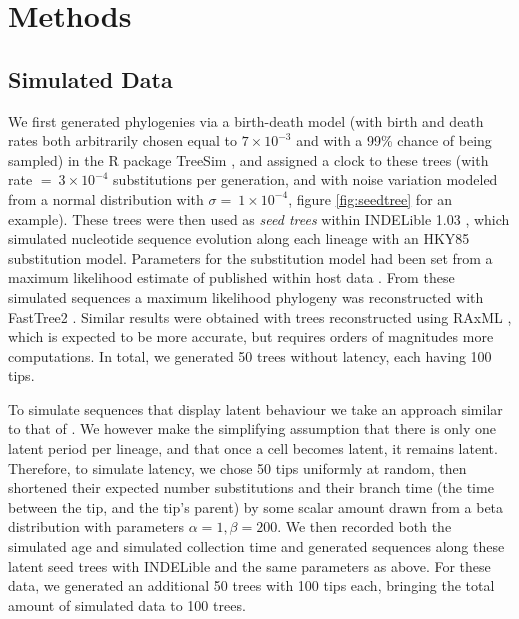 \section * {Methods} \label{sec:methods}
\subsection * {Simulated Data} \label{subsec:simdata}

We first generated phylogenies via a birth-death model (with birth and death rates both arbitrarily chosen equal to $7\times 10^{-3}$ and with a 99\% chance of being sampled) in the R package TreeSim \citep{TreeSim, Stradler13, Boskova14}, and assigned a clock to these trees (with rate $ = \ 3\times 10^{-4}$ substitutions per generation, and with noise variation modeled from a normal distribution with $\sigma = \ 1\times 10^{-4}$, figure \ref{fig:seedtree} for an example).
These trees were then used as {\em seed trees} within INDELible 1.03 \citep{Indelible09}, which simulated nucleotide sequence evolution along each lineage with an HKY85 \citep{HKY85} substitution model.
Parameters for the substitution model had been set from a maximum likelihood estimate of published within host data \citep{McCloskey14}. 
From these simulated sequences a maximum likelihood phylogeny was reconstructed with FastTree2 \citep{FastTree10}.
Similar results were obtained with trees reconstructed using RAxML \citep{Raxml14}, which is expected to be more accurate, but requires orders of magnitudes more computations.
In total, we generated 50 trees without latency, each having 100 tips. 

To simulate sequences that display latent behaviour we take an approach similar to that of \cite{Immonen14}. We however make the simplifying assumption that there is only one latent period per lineage, and that once a cell becomes latent, it remains latent.
Therefore, to simulate latency, we chose 50 tips uniformly at random, then shortened their expected number substitutions and their branch time (the time between the tip, and the tip's parent) by some scalar amount drawn from a beta distribution with parameters $\alpha=1, \beta=200$.
We then recorded both the simulated age and simulated collection time and generated sequences along these latent seed trees with INDELible and the same parameters as above. 
For these data, we generated an additional 50 trees with 100 tips each, bringing the total amount of simulated data to 100 trees.


